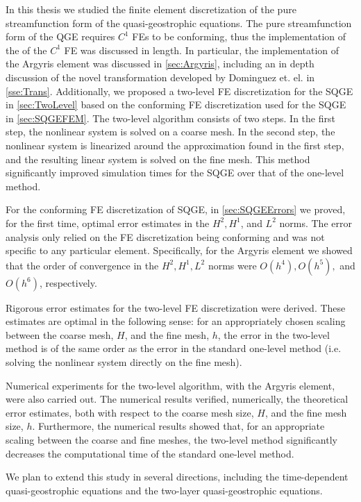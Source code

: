 In this thesis we studied the finite element discretization of the pure
streamfunction form of the quasi-geostrophic equations. The pure streamfunction
form of the QGE requires $C^1$ FEs to be conforming, thus the implementation of
the of the $C^1$ FE was discussed in length. In particular, the implementation
of the Argyris element was discussed in \autoref{sec:Argyris}, including an in
depth discussion of the novel transformation developed by Dominguez et. el.
\cite{Dominguez08} in \autoref{sse:Trans}. Additionally, we proposed a two-level
FE discretization for the SQGE in \autoref{sec:TwoLevel} based on the conforming
FE discretization used for the SQGE in \autoref{sec:SQGEFEM}. The two-level
algorithm consists of two steps. In the first step, the nonlinear system is
solved on a coarse mesh. In the second step, the nonlinear system is linearized
around the approximation found in the first step, and the resulting linear
system is solved on the fine mesh.  This method significantly improved
simulation times for the SQGE over that of the one-level method.

For the conforming FE discretization of SQGE, in \autoref{sec:SQGEErrors} we
proved, for the first time, optimal error estimates in the $H^2,H^1$, and $L^2$
norms. The error analysis only relied on the FE discretization being conforming
and was not specific to any particular element. Specifically, for the Argyris
element we showed that the order of convergence in the $H^2,H^1,L^2$ norms were
$O(h^4),O(h^5),$ and $O(h^6)$, respectively.

Rigorous error estimates for the two-level FE discretization were derived. These
estimates are optimal in the following sense: for an appropriately chosen
scaling between the coarse mesh, $H$, and the fine mesh, $h$, the error in the
two-level method is of the same order as the error in the standard one-level
method (i.e. solving the nonlinear system directly on the fine mesh).

Numerical experiments for the two-level algorithm, with the Argyris element,
were also carried out. The numerical results verified, numerically, the
theoretical error estimates, both with respect to the coarse mesh size, $H$, and
the fine mesh size, $h$.  Furthermore, the numerical results showed that, for an
appropriate scaling between the coarse and fine meshes, the two-level method
significantly decreases the computational time of the standard one-level method.

We plan to extend this study in several directions, including the time-dependent
quasi-geostrophic equations and the two-layer quasi-geostrophic equations.
